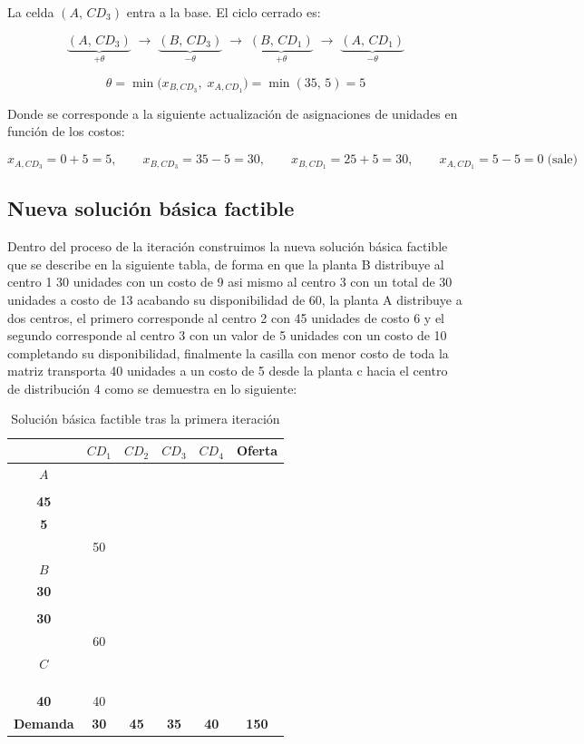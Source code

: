\documentclass{article}
\newcommand{\BC}[2]{%
	\cellcolor{celBasica}%
	\makecell{\scriptsize\textit{#1}\\[4pt]\textbf{\large #2}}%
}
\newcommand{\NC}[1]{%
	\makecell{\scriptsize\textit{#1}\\[4pt]\phantom{000}}%
}
\renewcommand{\arraystretch}{2.4}
\begin{document}
	La celda $(A,\,CD_3)$ entra a la base. El ciclo cerrado es:
	
	\[
	\underbrace{(A,\,CD_3)}_{+\theta}
	\;\longrightarrow\;
	\underbrace{(B,\,CD_3)}_{-\theta}
	\;\longrightarrow\;
	\underbrace{(B,\,CD_1)}_{+\theta}
	\;\longrightarrow\;
	\underbrace{(A,\,CD_1)}_{-\theta}
	\]
	
	\[
	\theta = \min\bigl(x_{B,CD_3},\; x_{A,CD_1}\bigr) = \min(35,\,5) = 5
	\]
	
	Donde se corresponde a la siguiente actualización de asignaciones de unidades en función de los costos:
	
	\[
	x_{A,CD_3} = 0+5 = 5, \qquad
	x_{B,CD_3} = 35-5 = 30, \qquad
	x_{B,CD_1} = 25+5 = 30, \qquad
	x_{A,CD_1} = 5-5 = 0 \;\text{(sale)}
	\]
	
	\subsection{Nueva solución básica factible}
	
	Dentro del proceso de la iteración construimos la nueva solución básica factible que se describe en la siguiente tabla, de forma en que la planta B distribuye al centro 1 30 unidades con un costo de 9 asi mismo al centro 3 con un total de 30 unidades a costo de 13 acabando su disponibilidad de 60, la planta A distribuye a dos centros, el primero corresponde al centro 2 con 45 unidades de costo 6 y el segundo corresponde al centro 3 con un valor de 5 unidades con un costo de 10 completando su disponibilidad, finalmente la casilla con menor costo de toda la matriz transporta 40 unidades a un costo de 5 desde la planta c hacia el centro de distribución 4 como se demuestra en lo siguiente:
	\begin{table}[ht]
		\centering
		\renewcommand{\arraystretch}{2.4}
		\begin{tabular}{>{\bfseries}c | cccc | >{\bfseries}c}
			\hline\hline
			& \textbf{$CD_1$} & \textbf{$CD_2$} & \textbf{$CD_3$} & \textbf{$CD_4$} & \textbf{Oferta} \\
			\hline
			$A$   & \NC{8}       & \BC{6}{45}  & \BC{10}{5}  & \NC{}       & 50 \\
			$B$   & \BC{9}{30}   & \NC{}        & \BC{13}{30} & \NC{}       & 60 \\
			$C$   & \NC{}         & \NC{}        & \NC{}        & \BC{5}{40}  & 40 \\
			\hline
			\textbf{Demanda} & \textbf{30} & \textbf{45} & \textbf{35} & \textbf{40} & \textbf{150} \\
			\hline\hline
		\end{tabular}
		\caption{Solución básica factible tras la primera iteración}
	\end{table}
	
\end{document}
